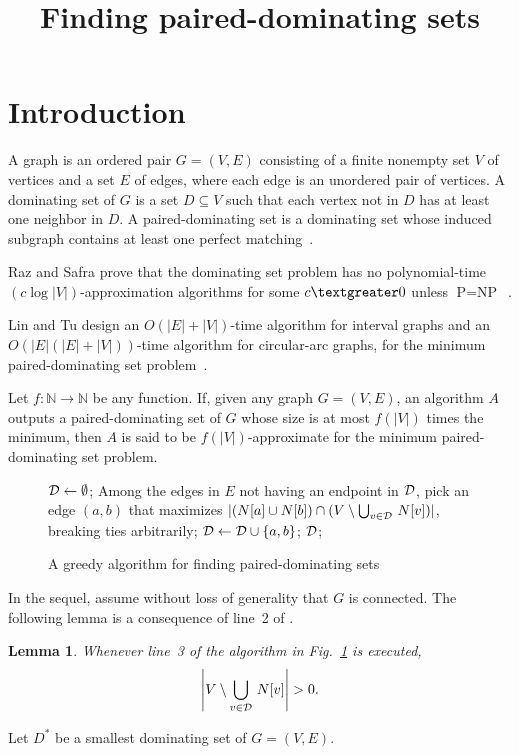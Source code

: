 \documentclass[12pt]{article}
\title{\textbf{Finding paired-dominating sets }}
\date{}
\begin{document}
\maketitle
\newtheorem{lemma}{Lemma}

\section{Introduction}
A graph is an ordered pair $G=(V,E)$ consisting of a finite nonempty set $V$ of vertices and a set $E$ of edges, where each edge is an unordered pair of vertices. A dominating set of $G$ is a set $D \subseteq V$ such that each vertex not in $D$ has at least one neighbor in $D$. A paired-dominating set is a dominating set whose induced subgraph contains at least one perfect matching~\cite{1}.

Raz and Safra prove that the dominating set problem has no polynomial-time $(c \log|V|)$-approximation algorithms for some $c \textgreater  0$ unless $\text{P}=\text{NP}$~\cite{2}.

Lin and Tu design an $O(|E|+|V|)$-time algorithm for interval graphs and an $O(|E|(|E|+|V|))$-time algorithm for circular-arc graphs, for the minimum paired-dominating set problem~\cite {3}.

Let $f\colon \mathbb{N}\to \mathbb{N}$ be any function. If, given any graph $G=(V,E)$, an algorithm $A$ outputs a paired-dominating set of $G$ whose size is at most $f(|V|)$ times the minimum, then $A$ is said to be $f(|V|)$-approximate for the minimum paired-dominating set problem. 
\clearpage

\begin{figure}
\begin{algorithmic}[1]

\STATE ${\cal D}\leftarrow \emptyset$;
  \STATE Among the edges in $E$ not having an endpoint in ${\cal D}$, pick
an edge $(a,b)$
that maximizes $|(N[a]\cup N[b])\cap (V\setminus \bigcup_{v\in {\cal D}}\,N[v])|$,
breaking ties arbitrarily;
  \STATE ${\cal D}\leftarrow {\cal D}\cup\{a,b\}$;
\ENDWHILE
\RETURN ${\cal D}$;
\end{algorithmic}
\caption{A greedy algorithm for finding paired-dominating sets}
\label{abc}
\end{figure}

In the sequel, assume without loss of generality that $G$ is connected. The following lemma is a consequence of line~2 of .
\begin{lemma}
Whenever line~3 of the algorithm in Fig.~\ref{abc} is executed, 
$$
\left|V\setminus \bigcup_{v\in {\cal D}}\,N[v]\right|>0.
$$
\end{lemma}
Let $D^*$ be a smallest dominating set of $G=(V,E)$.
\end{document}
